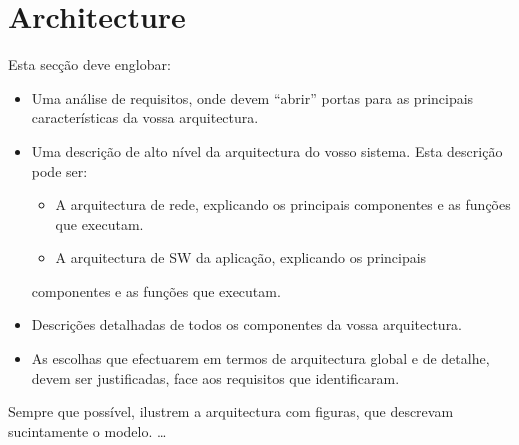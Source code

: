 \chapter{Architecture}\label{architecture}
Esta secção deve englobar:

\begin{itemize}
    \item Uma análise de requisitos, onde devem “abrir” portas para as principais
        características da vossa arquitectura.
    \item Uma descrição de alto nível da arquitectura do vosso sistema. Esta descrição
        pode ser:
        \begin{itemize}
            \item A arquitectura de rede, explicando os principais componentes e as
                funções que executam.
            \item A arquitectura de SW da aplicação, explicando os principais
        \end{itemize}
        componentes e as funções que executam.
    \item Descrições detalhadas de todos os componentes da vossa arquitectura.
    \item As escolhas que efectuarem em termos de arquitectura global e de detalhe,
        devem ser justificadas, face aos requisitos que identificaram.
\end{itemize}

Sempre que possível, ilustrem a arquitectura com figuras, que descrevam
sucintamente o modelo.
\ldots
